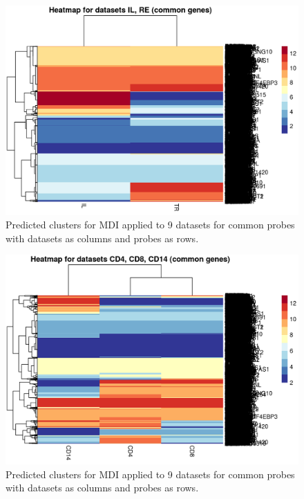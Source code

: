 \documentclass[12pt]{article} %
\begin{document}
	\begin{figure}[h]
		\includegraphics[scale=1.0]{Images/Initial_analysis/sim_heatmaps-2.png}
		\caption{Predicted clusters for MDI applied to 9 datasets for common probes with datasets as columns and probes as rows.}
		\label{fig:naive_mdi_reduced_il_tr_cluster}
	\end{figure}
	
	\begin{figure}[h]
		\includegraphics[scale=1.0]{Images/Initial_analysis/sim_heatmaps-3.png}
		\caption{Predicted clusters for MDI applied to 9 datasets for common probes with datasets as columns and probes as rows.}
		\label{fig:naive_mdi_reduced_cd14_cd4_cd8_cluster}
	\end{figure}
\end{document}
